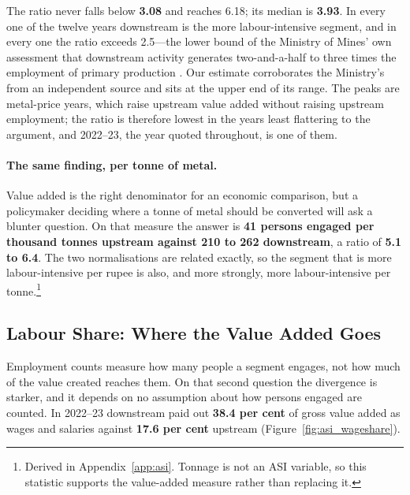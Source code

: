 \documentclass[11pt, a4paper]{article}
\numberwithin{figure}{section}
\numberwithin{table}{section}
\begin{document}
The ratio never falls below \textbf{3.08} and reaches 6.18; its median is \textbf{3.93}. In every one of the twelve years downstream is the more labour-intensive segment, and in every one the ratio exceeds 2.5---the lower bound of the Ministry of Mines' own assessment that downstream activity generates two-and-a-half to three times the employment of primary production \cite{mom_vision2025}. Our estimate corroborates the Ministry's from an independent source and sits at the upper end of its range. The peaks are metal-price years, which raise upstream value added without raising upstream employment; the ratio is therefore lowest in the years least flattering to the argument, and 2022--23, the year quoted throughout, is one of them.

\paragraph{The same finding, per tonne of metal.} Value added is the right denominator for an economic comparison, but a policymaker deciding where a tonne of metal should be converted will ask a blunter question. On that measure the answer is \textbf{41 persons engaged per thousand tonnes upstream against 210 to 262 downstream}, a ratio of \textbf{5.1 to 6.4}. The two normalisations are related exactly, so the segment that is more labour-intensive per rupee is also, and more strongly, more labour-intensive per tonne.\footnote{Derived in Appendix~\ref{app:asi}. Tonnage is not an ASI variable, so this statistic supports the value-added measure rather than replacing it.}

\subsection{Labour Share: Where the Value Added Goes}

Employment counts measure how many people a segment engages, not how much of the value created reaches them. On that second question the divergence is starker, and it depends on no assumption about how persons engaged are counted. In 2022--23 downstream paid out \textbf{38.4 per cent} of gross value added as wages and salaries against \textbf{17.6 per cent} upstream (Figure~\ref{fig:asi_wageshare}).
\end{document}
